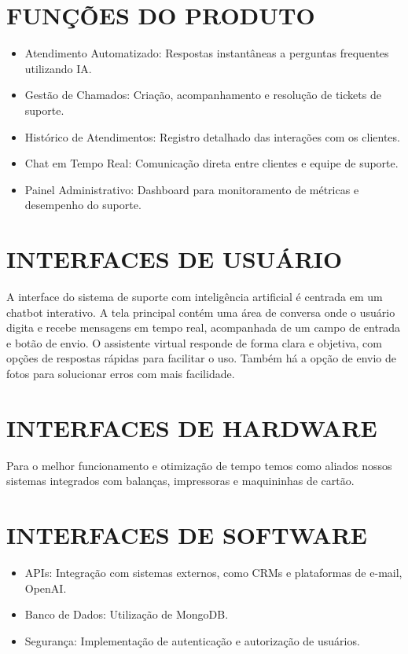 \documentclass[a4paper,12pt]{article}
\begin{document}
\section{FUNÇÕES DO PRODUTO}
\begin{itemize}
    \item Atendimento Automatizado: Respostas instantâneas a perguntas frequentes utilizando IA.
    \item Gestão de Chamados: Criação, acompanhamento e resolução de tickets de suporte.
    \item Histórico de Atendimentos: Registro detalhado das interações com os clientes.
    \item Chat em Tempo Real: Comunicação direta entre clientes e equipe de suporte.
    \item Painel Administrativo: Dashboard para monitoramento de métricas e desempenho do suporte.
\end{itemize}

\section{INTERFACES DE USUÁRIO}
A interface do sistema de suporte com inteligência artificial é centrada em um chatbot interativo. A tela principal contém uma área de conversa onde o usuário digita e recebe mensagens em tempo real, acompanhada de um campo de entrada e botão de envio. O assistente virtual responde de forma clara e objetiva, com opções de respostas rápidas para facilitar o uso. Também há a opção de envio de fotos para solucionar erros com mais facilidade.

\section{INTERFACES DE HARDWARE}
Para o melhor funcionamento e otimização de tempo temos como aliados nossos sistemas integrados com balanças, impressoras e maquininhas de cartão.

\section{INTERFACES DE SOFTWARE}
\begin{itemize}
    \item APIs: Integração com sistemas externos, como CRMs e plataformas de e-mail, OpenAI.
    \item Banco de Dados: Utilização de MongoDB.
    \item Segurança: Implementação de autenticação e autorização de usuários.
\end{itemize}
\end{document}
